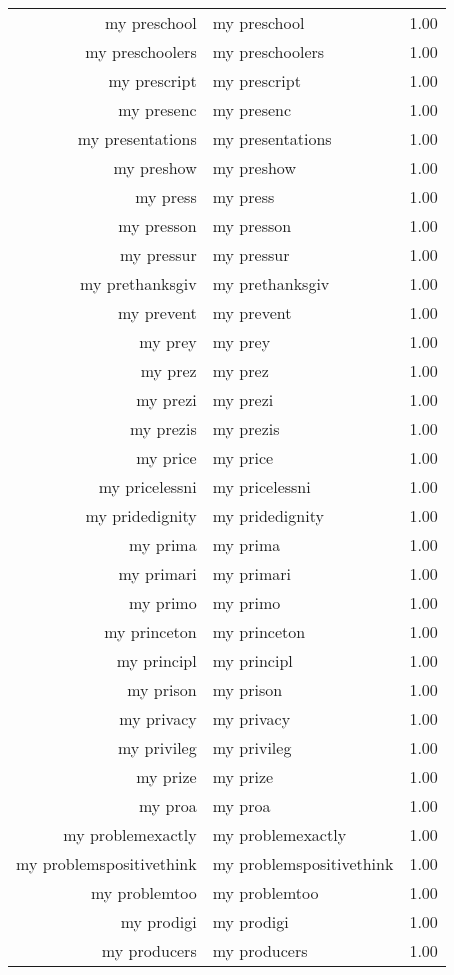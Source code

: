 \begin{table}[ht]
\begin{tabular}{rlr}
  my preschool & my preschool & 1.00 \\ 
  my preschoolers & my preschoolers & 1.00 \\ 
  my prescript & my prescript & 1.00 \\ 
  my presenc & my presenc & 1.00 \\ 
  my presentations & my presentations & 1.00 \\ 
  my preshow & my preshow & 1.00 \\ 
  my press & my press & 1.00 \\ 
  my presson & my presson & 1.00 \\ 
  my pressur & my pressur & 1.00 \\ 
  my prethanksgiv & my prethanksgiv & 1.00 \\ 
  my prevent & my prevent & 1.00 \\ 
  my prey & my prey & 1.00 \\ 
  my prez & my prez & 1.00 \\ 
  my prezi & my prezi & 1.00 \\ 
  my prezis & my prezis & 1.00 \\ 
  my price & my price & 1.00 \\ 
  my pricelessni & my pricelessni & 1.00 \\ 
  my pridedignity & my pridedignity & 1.00 \\ 
  my prima & my prima & 1.00 \\ 
  my primari & my primari & 1.00 \\ 
  my primo & my primo & 1.00 \\ 
  my princeton & my princeton & 1.00 \\ 
  my principl & my principl & 1.00 \\ 
  my prison & my prison & 1.00 \\ 
  my privacy & my privacy & 1.00 \\ 
  my privileg & my privileg & 1.00 \\ 
  my prize & my prize & 1.00 \\ 
  my proa & my proa & 1.00 \\ 
  my problemexactly & my problemexactly & 1.00 \\ 
  my problemspositivethink & my problemspositivethink & 1.00 \\ 
  my problemtoo & my problemtoo & 1.00 \\ 
  my prodigi & my prodigi & 1.00 \\ 
  my producers & my producers & 1.00 \\ 

\end{tabular}
\end{table}
